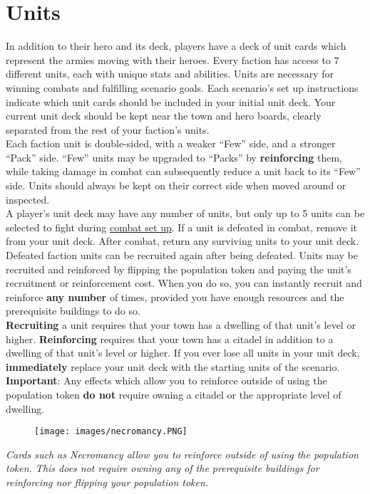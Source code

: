 \documentclass[12pt]{article}
\begin{document}
\clearpage
\section[Units]{Units\hypertarget{Units}{}}

In addition to their hero and its deck, players have a deck of unit cards which represent the armies moving with their heroes. Every faction has access to 7 different units, each with unique stats and abilities. Units are necessary for winning combats and fulfilling scenario goals. Each scenario's set up instructions indicate which unit cards should be included in your initial unit deck. Your current unit deck should be kept near the town and hero boards, clearly separated from the rest of your faction’s units.\\[6pt]
Each faction unit is double-sided, with a weaker “Few” side, and a stronger “Pack” side. “Few” units may be upgraded to “Packs” by \textbf{reinforcing} them, while taking damage in combat can subsequently reduce a unit back to its “Few” side. Units should always be kept on their correct side when moved around or inspected.\\[6pt]
A player’s unit deck may have any number of units, but only up to 5 units can be selected to fight during \hyperlink{Combatsetup}{combat set up}. If a unit is defeated in combat, remove it from your unit deck. After combat, return any surviving units to your unit deck. Defeated faction units can be recruited again after being defeated. Units may be recruited and reinforced by flipping the population token and paying the unit's recruitment  or reinforcement  cost. When you do so, you can instantly recruit and reinforce \textbf{any number} of times, provided you have enough resources and the prerequisite buildings to do so.\\[6pt]
\textbf{Recruiting} a unit requires that your town has a dwelling of that unit’s level or higher. \textbf{Reinforcing} requires that your town has a citadel in addition to a dwelling of that unit’s level or higher. If you ever lose all units in your unit deck, \textbf{immediately} replace your unit deck with the starting units of the scenario.\\[6pt]
\textbf{Important}: Any effects which allow you to reinforce outside of using the population token \textbf{do not} require owning a citadel or the appropriate level of dwelling.
\begin{figure}[h]
\centering
\texttt{[image: images/necromancy.PNG]}
\end{figure}
\begin{center}
\textit{Cards such as Necromancy allow you to reinforce outside of using the population token. This does not require owning any of the prerequisite buildings for reinforcing nor flipping your population token.}
\end{center}
\end{document}
